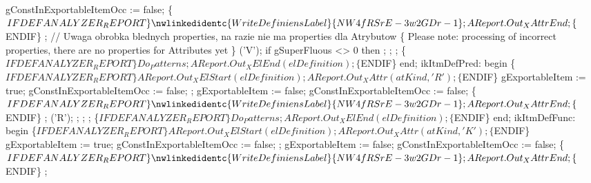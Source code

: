             gConstInExportableItemOcc := false;
            \{$IFDEF ANALYZER_REPORT\}
            \nwlinkedidentc{WriteDefiniensLabel}{NW4fRSrE-3w2GDr-1};
            AReport.Out_XAttrEnd;
            \{$ENDIF\}
            ;
            //   Uwaga obrobka blednych properties, na razie nie ma properties dla Atrybutow
            \{ Please note: processing of incorrect properties, there are no properties for Attributes yet \}
            ('V');
            if gSuperFluous <> 0 then
               ;
            ;
            ;
            \{$IFDEF ANALYZER_REPORT\}
            Do_Patterns;
            AReport.Out_XElEnd(elDefinition);
            \{$ENDIF\}
         end;
      ikItmDefPred:
         begin
            \{$IFDEF ANALYZER_REPORT\}
            AReport.Out_XElStart(elDefinition);
            AReport.Out_XAttr(atKind, 'R');
            \{$ENDIF\}
            gExportableItem := true;
            gConstInExportableItemOcc := false;
            ;
            gExportableItem := false;
            gConstInExportableItemOcc := false;
            \{$IFDEF ANALYZER_REPORT\}
            \nwlinkedidentc{WriteDefiniensLabel}{NW4fRSrE-3w2GDr-1};
            AReport.Out_XAttrEnd;
            \{$ENDIF\}
            ;
            ('R');
            ;
            ;
            ;
            \{$IFDEF ANALYZER_REPORT\}
            Do_Patterns;
            AReport.Out_XElEnd(elDefinition);
            \{$ENDIF\}
         end;
      ikItmDefFunc:
         begin
            \{$IFDEF ANALYZER_REPORT\}
            AReport.Out_XElStart(elDefinition);
            AReport.Out_XAttr(atKind, 'K');
            \{$ENDIF\}
            gExportableItem := true;
            gConstInExportableItemOcc := false;
            ;
            gExportableItem := false;
            gConstInExportableItemOcc := false;
            \{$IFDEF ANALYZER_REPORT\}
            \nwlinkedidentc{WriteDefiniensLabel}{NW4fRSrE-3w2GDr-1};
            AReport.Out_XAttrEnd;
            \{$ENDIF\}
            ;
